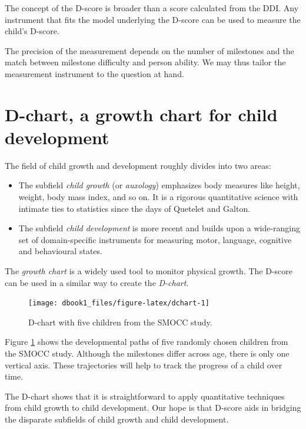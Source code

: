 \documentclass[
]{book}
\begin{document}
The concept of the D-score is broader than a score calculated from the DDI. Any instrument that fits the model underlying the D-score can be used to measure the child's D-score.

The precision of the measurement depends on the number of milestones and the match between milestone difficulty and person ability. We may thus tailor the measurement instrument to the question at hand.

\hypertarget{d-chart-a-growth-chart-for-child-development}{%
\section{D-chart, a growth chart for child development}\label{d-chart-a-growth-chart-for-child-development}}

The field of child growth and development roughly divides into two areas:

\begin{itemize}
\item
  The subfield \emph{child growth} (or \emph{auxology}) emphasizes body measures like height, weight, body mass index, and so on. It is a rigorous quantitative science with intimate ties to statistics since the days of Quetelet and Galton.
\item
  The subfield \emph{child development} is more recent and builds upon a wide-ranging set of domain-specific instruments for measuring motor, language, cognitive and behavioural states.
\end{itemize}

The \emph{growth chart} is a widely used tool to monitor physical growth. The D-score can be used in a similar way to create the \emph{D-chart}.

\begin{figure}

{\centering \texttt{[image: dbook1\_files/figure-latex/dchart-1]} 

}

\caption{D-chart with five children from the SMOCC study.}\label{fig:dchart}
\end{figure}



Figure \ref{fig:dchart} shows the developmental paths of five randomly chosen children from the SMOCC study. Although the milestones differ across age, there is only one vertical axis. These trajectories will help to track the progress of a child over time.

The D-chart shows that it is straightforward to apply quantitative techniques from child growth to child development. Our hope is that D-score aids in bridging the disparate subfields of child growth and child development.
\end{document}

